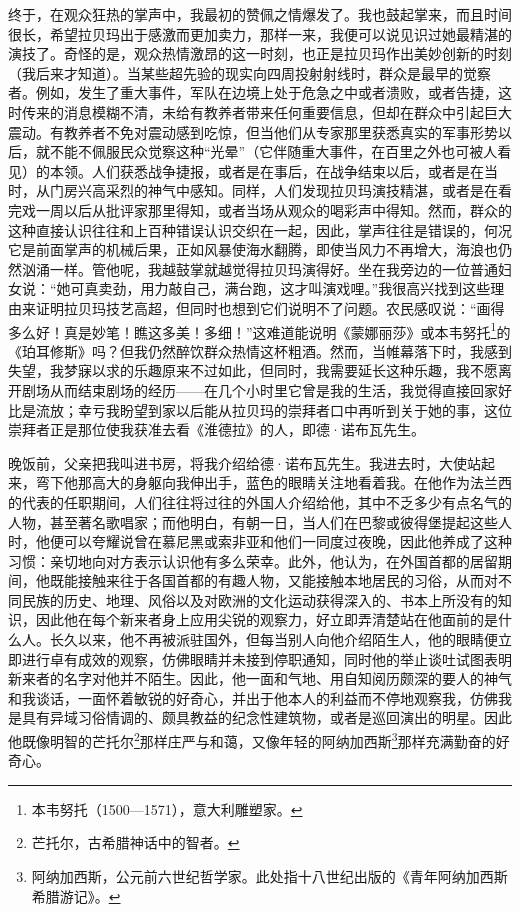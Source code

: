 \par 终于，在观众狂热的掌声中，我最初的赞佩之情爆发了。我也鼓起掌来，而且时间很长，希望拉贝玛出于感激而更加卖力，那样一来，我便可以说见识过她最精湛的演技了。奇怪的是，观众热情激昂的这一时刻，也正是拉贝玛作出美妙创新的时刻（我后来才知道）。当某些超先验的现实向四周投射射线时，群众是最早的觉察者。例如，发生了重大事件，军队在边境上处于危急之中或者溃败，或者告捷，这时传来的消息模糊不清，未给有教养者带来任何重要信息，但却在群众中引起巨大震动。有教养者不免对震动感到吃惊，但当他们从专家那里获悉真实的军事形势以后，就不能不佩服民众觉察这种“光晕”（它伴随重大事件，在百里之外也可被人看见）的本领。人们获悉战争捷报，或者是在事后，在战争结束以后，或者是在当时，从门房兴高采烈的神气中感知。同样，人们发现拉贝玛演技精湛，或者是在看完戏一周以后从批评家那里得知，或者当场从观众的喝彩声中得知。然而，群众的这种直接认识往往和上百种错误认识交织在一起，因此，掌声往往是错误的，何况它是前面掌声的机械后果，正如风暴使海水翻腾，即使当风力不再增大，海浪也仍然汹涌一样。管他呢，我越鼓掌就越觉得拉贝玛演得好。坐在我旁边的一位普通妇女说：“她可真卖劲，用力敲自己，满台跑，这才叫演戏哩。”我很高兴找到这些理由来证明拉贝玛技艺高超，但同时也想到它们说明不了问题。农民感叹说：“画得多么好！真是妙笔！瞧这多美！多细！”这难道能说明《蒙娜丽莎》或本韦努托\footnote{本韦努托（1500—1571），意大利雕塑家。}的《珀耳修斯》吗？但我仍然醉饮群众热情这杯粗酒。然而，当帷幕落下时，我感到失望，我梦寐以求的乐趣原来不过如此，但同时，我需要延长这种乐趣，我不愿离开剧场从而结束剧场的经历——在几个小时里它曾是我的生活，我觉得直接回家好比是流放；幸亏我盼望到家以后能从拉贝玛的崇拜者口中再听到关于她的事，这位崇拜者正是那位使我获准去看《淮德拉》的人，即德·诺布瓦先生。
\par 晚饭前，父亲把我叫进书房，将我介绍给德·诺布瓦先生。我进去时，大使站起来，弯下他那高大的身躯向我伸出手，蓝色的眼睛关注地看着我。在他作为法兰西的代表的任职期间，人们往往将过往的外国人介绍给他，其中不乏多少有点名气的人物，甚至著名歌唱家；而他明白，有朝一日，当人们在巴黎或彼得堡提起这些人时，他便可以夸耀说曾在慕尼黑或索非亚和他们一同度过夜晚，因此他养成了这种习惯：亲切地向对方表示认识他有多么荣幸。此外，他认为，在外国首都的居留期间，他既能接触来往于各国首都的有趣人物，又能接触本地居民的习俗，从而对不同民族的历史、地理、风俗以及对欧洲的文化运动获得深入的、书本上所没有的知识，因此他在每个新来者身上应用尖锐的观察力，好立即弄清楚站在他面前的是什么人。长久以来，他不再被派驻国外，但每当别人向他介绍陌生人，他的眼睛便立即进行卓有成效的观察，仿佛眼睛并未接到停职通知，同时他的举止谈吐试图表明新来者的名字对他并不陌生。因此，他一面和气地、用自知阅历颇深的要人的神气和我谈话，一面怀着敏锐的好奇心，并出于他本人的利益而不停地观察我，仿佛我是具有异域习俗情调的、颇具教益的纪念性建筑物，或者是巡回演出的明星。因此他既像明智的芒托尔\footnote{芒托尔，古希腊神话中的智者。}那样庄严与和蔼，又像年轻的阿纳加西斯\footnote{阿纳加西斯，公元前六世纪哲学家。此处指十八世纪出版的《青年阿纳加西斯希腊游记》。}那样充满勤奋的好奇心。

